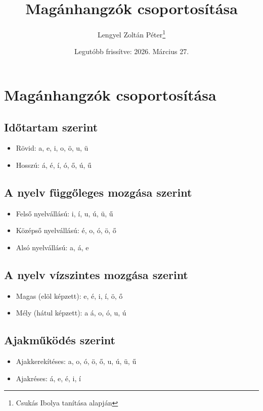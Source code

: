 \documentclass{article}
\title{Magánhangzók csoportosítása}
\author{Lengyel Zoltán Péter\thanks{Csukás Ibolya tanítása alapján}}
\date{Legutóbb frissítve: 2026. Március 27.}
\begin{document}
\maketitle
\tableofcontents
\newpage

 \section{Magánhangzók csoportosítása}
 \subsection{Időtartam szerint}
 \begin{itemize}
     \item Rövid: a, e, i, o, ö, u, ü
     \item Hosszú: á, é, í, ó, ő, ú, ű
 \end{itemize}

 \subsection{A nyelv függőleges mozgása szerint}
 \begin{itemize}
     \item Felső nyelvállású: i, í, u, ú, ü, ű
     \item Középső nyelvállású: é, o, ó, ö, ő
     \item Alsó nyelvállású: a, á, e
 \end{itemize}

\subsection{A nyelv vízszintes mozgása szerint}
\begin{itemize}
    \item Magas (elöl képzett): e, é, i, í, ö, ő
    \item Mély (hátul képzett): a á, o, ó, u, ú
\end{itemize}

\subsection{Ajakműködés szerint}
\begin{itemize}
    \item Ajakkerekítéses: a, o, ó, ö, ő, u, ú, ü, ű
    \item Ajakréses: á, e, é, i, í
\end{itemize}
\end{document}
